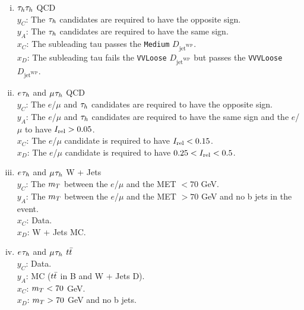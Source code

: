 \begin{enumerate}[i)]
   \item $\tau_{h}\tau_{h}$ QCD \\
     \indent $y_C$: The $\tau_{h}$ candidates are required to have the opposite sign. \\
     \indent $y_A$: The $\tau_{h}$ candidates are required to have the same sign. \\
     \indent $x_C$: The subleading tau passes the \texttt{Medium} $D_{\text{jet}^{\text{WP}}}$. \\
     \indent $x_D$: The subleading tau fails the \texttt{VVLoose} $D_{\text{jet}^{\text{WP}}}$ but passes the \texttt{VVVLoose} $D_{\text{jet}^{\text{WP}}}$.
  \item $e_{}\tau_{h}$ and $\mu_{}\tau_{h}$ QCD \\
    \indent $y_C$: The $e$/$\mu$ and $\tau_{h}$ candidates are required to have the opposite sign. \\
    \indent $y_A$: The $e$/$\mu$ and $\tau_{h}$ candidates are required to have the same sign and the $e$/$\mu$ to have $I_{\text{rel}}>0.05$. \\
    \indent $x_C$: The $e$/$\mu$ candidate is required to have $I_{\text{rel}}<0.15$. \\
    \indent $x_D$: The $e$/$\mu$ candidate is required to have $0.25<I_{\text{rel}}<0.5$.
  \item $e_{}\tau_{h}$ and $\mu_{}\tau_{h}$ W + Jets \\
    \indent $y_C$: The $m_{T}$ between the $e$/$\mu$ and the MET $< 70$ GeV. \\
    \indent $y_A$: The $m_{T}$ between the $e$/$\mu$ and the MET $> 70$ GeV and no b jets in the event. \\
    \indent $x_C$: Data. \\
    \indent $x_D$: W + Jets MC.
  \item $e_{}\tau_{h}$ and $\mu_{}\tau_{h}$ $t\bar{t}$ \\
    \indent $y_C$: Data. \\
    \indent $y_A$: MC ($t\bar{t}$ in B and W + Jets D). \\
    \indent $x_C$: $m_{T} < 70$ GeV. \\
    \indent $x_D$: $m_{T} > 70$ GeV and no b jets. \\
\end{enumerate}


